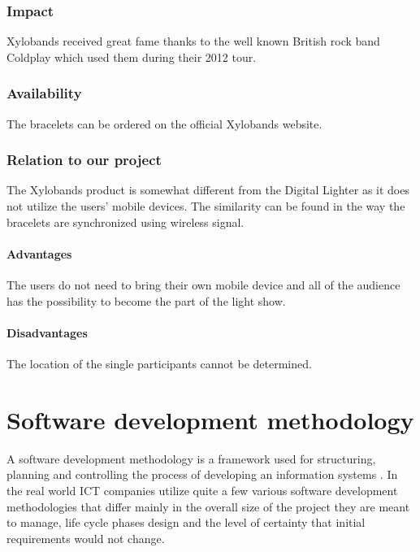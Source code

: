\subsubsection{Impact}
Xylobands received great fame thanks to the well known British rock band Coldplay which used them during their 2012 tour.

\subsubsection{Availability}
The bracelets can be ordered on the official Xylobands website.

\subsubsection{Relation to our project}
The Xylobands product is somewhat different from the Digital Lighter as it does not utilize the users' mobile devices. 
The similarity can be found in the way the bracelets are synchronized using wireless signal. 

\paragraph{Advantages}
The users do not need to bring their own mobile device and all of the audience has the possibility to become the part of the light show.

\paragraph{Disadvantages}
The location of the single participants cannot be determined.


\section{Software development methodology}
\label{sec:methodology}
A software development methodology is a framework used for structuring, planning and controlling the process of developing an information systems \cite{selectingMethodology}. In the real world ICT companies utilize quite a few various software development methodologies that differ mainly in the overall size of the project they are meant to manage, life cycle phases design and the level of certainty that initial requirements would not change.

